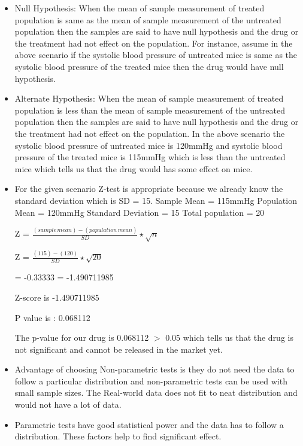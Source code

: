 \documentclass{article}
\begin{document}
\begin{itemize}
    \item Null Hypothesis:
		When the mean of sample measurement of treated population is same as the mean of sample measurement of the untreated population then the samples are said to have null hypothesis and the drug or the treatment had not effect on the population. For instance, assume in the above scenario if the systolic blood pressure of untreated mice is same as the systolic blood pressure of the treated mice then the drug would have null hypothesis.
	\item Alternate Hypothesis:
		When the mean of sample measurement of treated population is less than the mean of sample measurement of the untreated population then the samples are said to have null hypothesis and the drug or the treatment had not effect on the population. In the above scenario the systolic blood pressure of untreated mice is 120mmHg and systolic blood pressure of the treated mice is 115mmHg which is less than the untreated mice which tells us that the drug would has some effect on mice.

    \item 	For the given scenario Z-test is appropriate because we already know the standard deviation which is SD = 15.
	Sample Mean = 115mmHg
	Population Mean = 120mmHg
	Standard Deviation = 15
	Total population = 20
	
		Z = ${\displaystyle \frac{(sample\,mean) - (population\,mean)}{SD} \star \sqrt{n}}$
		
		Z = $\frac{(115)-(120)}{SD} \star \sqrt{20}$
		
		\newline = -0.33333 
		\newline= -1.490711985
		
		Z-score is -1.490711985
		
	P value is : 0.068112
	

The p-value for our drug is 0.068112 $>$ 0.05 which tells us that the drug is not significant and cannot be released in the market yet.




    \item  Advantage of choosing Non-parametric tests is they do not need the data to follow a particular distribution and non-parametric tests can be used with small sample sizes. The Real-world data does not fit to neat distribution and would not have a lot of data.
	
    \item Parametric tests have good statistical power and the data has to follow a distribution. These factors help to find significant effect.

\end{itemize}
\end{document}
